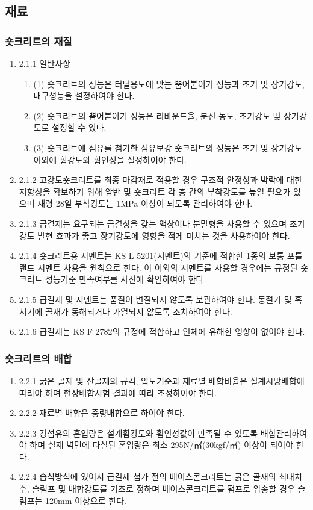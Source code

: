 \documentclass[12pt,a4paper]{article}
\begin{document}
\newpage
\subsection{재료}

\subsubsection{숏크리트의 재질}
\begin{enumerate}
\item  2.1.1 일반사항  
	\begin{enumerate}
	\item  (1) 숏크리트의 성능은 터널용도에 맞는 뿜어붙이기 성능과 초기 및 장기강도, 내구성능을 설정하여야 한다. 
	\item  (2) 숏크리트의 뿜어붙이기 성능은 리바운드율, 분진 농도, 초기강도 및 장기강도로 설정할 수 있다. 
	\item  (3) 숏크리트에 섬유를 첨가한 섬유보강 숏크리트의 성능은 초기 및 장기강도 이외에 휨강도와 휨인성을 설정하여야 한다. 
	\end{enumerate}
\item  2.1.2 고강도숏크리트를 최종 마감재로 적용할 경우 구조적 안정성과 박락에 대한 저항성을 확보하기 위해 암반 및 숏크리트 각 층 간의 부착강도를 높일 필요가 있으며 재령 28일 부착강도는 1MPa 이상이 되도록 관리하여야 한다.  
\item  2.1.3 급결제는 요구되는 급결성을 갖는 액상이나 분말형을 사용할 수 있으며 조기 강도 발현 효과가 좋고 장기강도에 영향을 적게 미치는 것을 사용하여야 한다.   
\item  2.1.4 숏크리트용 시멘트는 KS L 5201(시멘트)의 기준에 적합한 1종의 보통 포틀랜드 시멘트 사용을 원칙으로 한다. 이 이외의 시멘트를 사용할 경우에는 규정된 숏크리트 성능기준 만족여부를 사전에 확인하여야 한다.  
\item  2.1.5 급결제 및 시멘트는 품질이 변질되지 않도록 보관하여야 한다. 동절기 및 혹서기에 골재가 동해되거나 가열되지 않도록 조치하여야 한다.  
\item  2.1.6 급결제는 KS F 2782의 규정에 적합하고 인체에 유해한 영향이 없어야 한다.  
\end{enumerate}

\subsubsection{숏크리트의 배합}
\begin{enumerate}
\item  2.2.1 굵은 골재 및 잔골재의 규격, 입도기준과 재료별 배합비율은 설계시방배합에 따라야 하며 현장배합시험 결과에 따라 조정하여야 한다.  
\item  2.2.2 재료별 배합은 중량배합으로 하여야 한다.  
\item  2.2.3 강섬유의 혼입량은 설계휨강도와 휨인성값이 만족될 수 있도록 배합관리하여야 하며 실제 벽면에 타설된 혼입량은 최소 295N/㎥(30kgf/㎥) 이상이 되어야 한다.  
\item  2.2.4 습식방식에 있어서 급결제 첨가 전의 베이스콘크리트는 굵은 골재의 최대치수, 슬럼프 및 배합강도를 기초로 정하며 베이스콘크리트를 펌프로 압송할 경우 슬럼프는 120mm 이상으로 한다.  
\end{enumerate}
\end{document}
